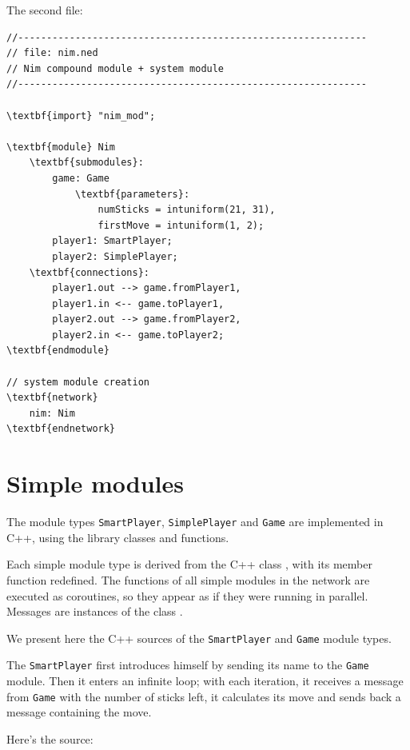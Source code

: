 The second file:

\begin{Verbatim}[commandchars=\\\{\}]
//-------------------------------------------------------------
// file: nim.ned
// Nim compound module + system module
//-------------------------------------------------------------

\textbf{import} "nim_mod";

\textbf{module} Nim
    \textbf{submodules}:
        game: Game
            \textbf{parameters}:
                numSticks = intuniform(21, 31),
                firstMove = intuniform(1, 2);
        player1: SmartPlayer;
        player2: SimplePlayer;
    \textbf{connections}:
        player1.out --> game.fromPlayer1,
        player1.in <-- game.toPlayer1,
        player2.out --> game.fromPlayer2,
        player2.in <-- game.toPlayer2;
\textbf{endmodule}

// system module creation
\textbf{network}
    nim: Nim
\textbf{endnetwork}
\end{Verbatim}



\section{Simple modules}

The module types \texttt{SmartPlayer}, \texttt{SimplePlayer} and \texttt{Game} are implemented
in C++, using the {\opp} library classes and functions.

Each simple module type is derived from the C++
class , with its  member
function redefined. The  functions of all
simple modules in the network are executed as
coroutines, so they appear as if they were running in
parallel.  Messages are instances of the class .

We present here the C++ sources of the \texttt{SmartPlayer} and \texttt{Game} module
types.

The \texttt{SmartPlayer} first introduces himself by sending its name
to the \texttt{Game} module. Then it enters an infinite loop; with each
iteration, it receives a message from \texttt{Game} with the number of
sticks left, it calculates its move and sends back a message
containing the move.

Here's the source:

